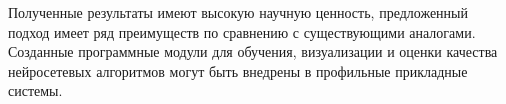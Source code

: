 \documentclass[LI,VKR]{HSEUniversity}
\begin{document}
Полученные результаты имеют высокую научную ценность,
предложенный подход имеет ряд преимуществ по сравнению с существующими аналогами.
Созданные программные модули для обучения,
визуализации и оценки качества нейросетевых алгоритмов могут быть внедрены в профильные прикладные системы.

%

\printbibliography
\appendix

\end{document}
